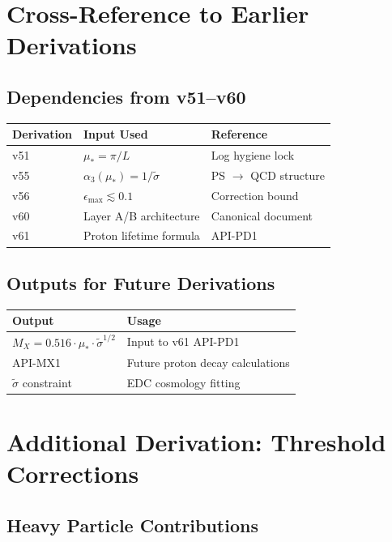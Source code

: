 \documentclass[11pt,a4paper]{article}
\theoremstyle{definition}
\begin{document}
\section{Cross-Reference to Earlier Derivations}
\label{app:cross-ref}

\subsection{Dependencies from v51--v60}
\label{app:dependencies}

\begin{center}
\begin{tabular}{lll}
\toprule
Derivation & Input Used & Reference \\
\midrule
v51 & $\mu_* = \pi/L$ & Log hygiene lock \\
v55 & $\alpha_3(\mu_*) = 1/\tilde{\sigma}$ & PS $\to$ QCD structure \\
v56 & $\epsilon_{\max} \lesssim 0.1$ & Correction bound \\
v60 & Layer A/B architecture & Canonical document \\
v61 & Proton lifetime formula & API-PD1 \\
\bottomrule
\end{tabular}
\end{center}

\subsection{Outputs for Future Derivations}
\label{app:outputs}

\begin{center}
\begin{tabular}{ll}
\toprule
Output & Usage \\
\midrule
$M_X = 0.516 \cdot \mu_* \cdot \tilde{\sigma}^{1/2}$ & Input to v61 API-PD1 \\
API-MX1 & Future proton decay calculations \\
$\tilde{\sigma}$ constraint & EDC cosmology fitting \\
\bottomrule
\end{tabular}
\end{center}

\section{Additional Derivation: Threshold Corrections}
\label{app:threshold}

\subsection{Heavy Particle Contributions}
\label{app:heavy-contributions}
\end{document}
